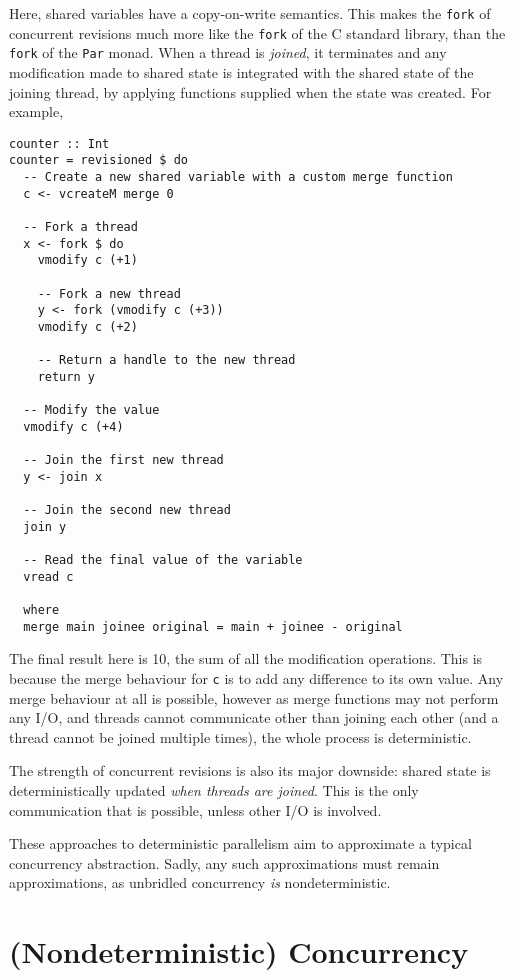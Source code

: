 Here, shared variables have a copy-on-write semantics. This makes the
\verb|fork| of concurrent revisions much more like the \verb|fork| of
the C standard library, than the \verb|fork| of the \verb|Par|
monad. When a thread is \textit{joined}, it terminates and any
modification made to shared state is integrated with the shared state
of the joining thread, by applying functions supplied when the state
was created. For example,

\begin{verbatim}
counter :: Int
counter = revisioned $ do
  -- Create a new shared variable with a custom merge function
  c <- vcreateM merge 0

  -- Fork a thread
  x <- fork $ do
    vmodify c (+1)

    -- Fork a new thread
    y <- fork (vmodify c (+3))
    vmodify c (+2)

    -- Return a handle to the new thread
    return y

  -- Modify the value
  vmodify c (+4)

  -- Join the first new thread
  y <- join x

  -- Join the second new thread
  join y

  -- Read the final value of the variable
  vread c

  where
  merge main joinee original = main + joinee - original
\end{verbatim}

The final result here is 10, the sum of all the modification
operations. This is because the merge behaviour for \verb|c| is to add
any difference to its own value. Any merge behaviour at all is
possible, however as merge functions may not perform any I/O, and
threads cannot communicate other than joining each other (and a thread
cannot be joined multiple times), the whole process is deterministic.

The strength of concurrent revisions is also its major downside:
shared state is deterministically updated \textit{when threads are
  joined}. This is the only communication that is possible, unless
other I/O is involved.

These approaches to deterministic parallelism aim to approximate a
typical concurrency abstraction. Sadly, any such approximations must
remain approximations, as unbridled concurrency \textit{is}
nondeterministic.

\section{(Nondeterministic) Concurrency}
\label{sec:litrev-conc}

